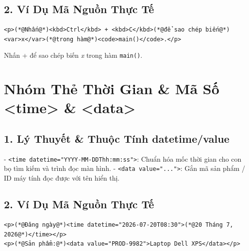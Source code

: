 \documentclass[11pt,oneside]{book}
\newcommand{\codeinline}[1]{\textcolor{accentOrange}{\texttt{#1}}}
\begin{document}
\subsection{2. Ví Dụ Mã Nguồn Thực Tế}
\begin{codeWindow}
\begin{lstlisting}[language=HTML5]
<p>(*@Nhấn@*)<kbd>Ctrl</kbd> + <kbd>C</kbd>(*@để sao chép biến@*)<var>x</var>(*@trong hàm@*)<code>main()</code>.</p>
\end{lstlisting}
\end{codeWindow}

\begin{browserWindow}
\sffamily\small
Nhấn  +  để sao chép biến \textit{x} trong hàm \codeinline{main()}.
\end{browserWindow}

\section{Nhóm Thẻ Thời Gian \& Mã Số <time> \& <data>}
\subsection{1. Lý Thuyết \& Thuộc Tính datetime/value}
- \codeinline{<time datetime="YYYY-MM-DDThh:mm:ss">}: Chuẩn hóa mốc thời gian cho con bọ tìm kiếm và trình đọc màn hình.
- \codeinline{<data value="...">}: Gắn mã sản phẩm / ID máy tính đọc được với tên hiển thị.

\subsection{2. Ví Dụ Mã Nguồn Thực Tế}
\begin{codeWindow}
\begin{lstlisting}[language=HTML5]
<p>(*@Đăng ngày@*)<time datetime="2026-07-20T08:30">(*@20 Tháng 7, 2026@*)</time></p>
<p>(*@Sản phẩm:@*)<data value="PROD-9982">Laptop Dell XPS</data></p>
\end{lstlisting}
\end{codeWindow}
\end{document}
